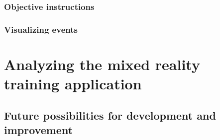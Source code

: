 \documentclass[12pt, a4paper,oneside, nocenter]{thesis}
\begin{document}
\subsection{Objective instructions}

\subsection{Visualizing events}
\par
\chapter{\texorpdfstring{Analyzing the mixed reality training application}{analysis-mixedr}}

\section{Future possibilities for development and improvement}


\newpage

\nocite{*}

\end{document}

